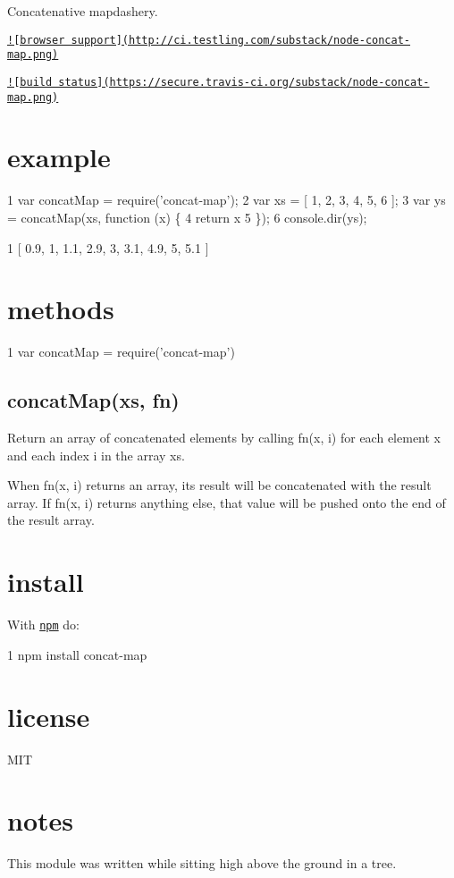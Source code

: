 Concatenative mapdashery.

\href{http://ci.testling.com/substack/node-concat-map}{\tt !\mbox{[}browser support\mbox{]}(http\+://ci.\+testling.\+com/substack/node-\/concat-\/map.\+png)}

\href{http://travis-ci.org/substack/node-concat-map}{\tt !\mbox{[}build status\mbox{]}(https\+://secure.\+travis-\/ci.\+org/substack/node-\/concat-\/map.\+png)}

\section*{example }


\begin{DoxyCode}
1 var concatMap = require('concat-map');
2 var xs = [ 1, 2, 3, 4, 5, 6 ];
3 var ys = concatMap(xs, function (x) \{
4     return x %
5 \});
6 console.dir(ys);
\end{DoxyCode}







\begin{DoxyCode}
1 [ 0.9, 1, 1.1, 2.9, 3, 3.1, 4.9, 5, 5.1 ]
\end{DoxyCode}


\section*{methods }


\begin{DoxyCode}
1 var concatMap = require('concat-map')
\end{DoxyCode}


\subsection*{concat\+Map(xs, fn) }

Return an array of concatenated elements by calling {\ttfamily fn(x, i)} for each element {\ttfamily x} and each index {\ttfamily i} in the array {\ttfamily xs}.

When {\ttfamily fn(x, i)} returns an array, its result will be concatenated with the result array. If {\ttfamily fn(x, i)} returns anything else, that value will be pushed onto the end of the result array.

\section*{install }

With \href{http://npmjs.org}{\tt npm} do\+:


\begin{DoxyCode}
1 npm install concat-map
\end{DoxyCode}


\section*{license }

M\+I\+T

\section*{notes }

This module was written while sitting high above the ground in a tree. 